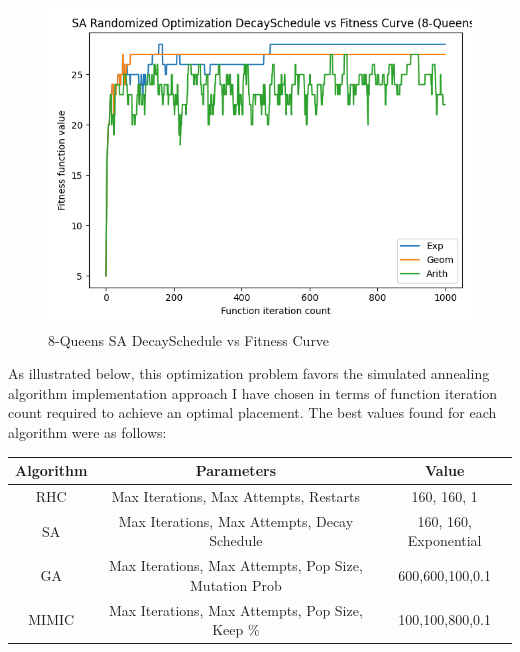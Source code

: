 \documentclass[11pt]{article}
\begin{document}
    \begin{figure}
        \begin{center}
            \includegraphics[width=1\linewidth]{eightqueensdecay.png}
            \caption{8-Queens SA DecaySchedule vs Fitness Curve}\label{Fig:8-Queens SA DecaySchedule vs Fitness Curve}
        \end{center}
    \end{figure}
    As illustrated below, this optimization problem favors the simulated annealing algorithm implementation approach I have chosen
    in terms of function iteration count required to achieve an optimal placement.
    The best values found for each algorithm were as follows:
    \begin{center}
        \begin{tabular}{| c | c | c |}
            \hline
            Algorithm & Parameters                                            & Value                 \\
            \hline
            \hline
            RHC       & Max Iterations, Max Attempts, Restarts                & 160, 160, 1           \\
            \hline
            SA        & Max Iterations, Max Attempts, Decay Schedule          & 160, 160, Exponential \\
            \hline
            GA        & Max Iterations, Max Attempts, Pop Size, Mutation Prob & 600,600,100,0.1       \\
            \hline
            MIMIC     & Max Iterations, Max Attempts, Pop Size, Keep \%       & 100,100,800,0.1       \\
            \hline
        \end{tabular}
    \end{center}
\end{document}
